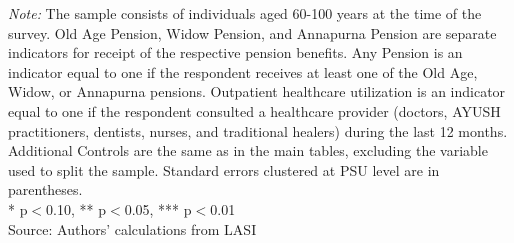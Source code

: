 \begin{table}[H]
{\begin{tabular}{lcccccc}
\bottomrule
\midrule
\end{tabular}
}
\vspace{2mm}
\begin{minipage}{0.95\textwidth}
\footnotesize \textit{Note:} The sample consists of individuals aged 60-100 years at the time of the survey. Old Age Pension, Widow Pension, and Annapurna Pension are separate indicators for receipt of the respective pension benefits. Any Pension is an indicator equal to one if the respondent receives at least one of the Old Age, Widow, or Annapurna pensions. Outpatient healthcare utilization is an indicator equal to one if the respondent consulted a healthcare provider (doctors, AYUSH practitioners, dentists, nurses, and traditional healers) during the last 12 months. Additional Controls are the same as in the main tables, excluding the variable used to split the sample. Standard errors clustered at PSU level are in parentheses. \\ * p$<$0.10, ** p$<$0.05, *** p$<$0.01\\
Source: Authors' calculations from LASI
\end{minipage}
\end{table}
